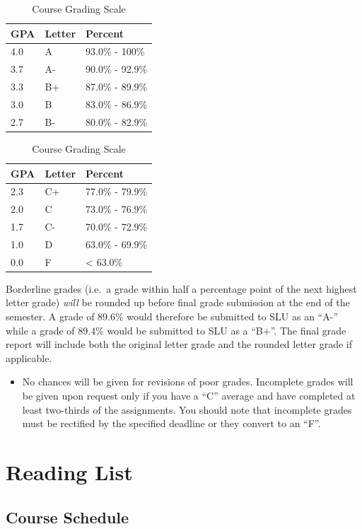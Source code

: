 \documentclass[]{book}
\newenvironment{rmdblock}[1]
  {\begin{shaded*}
  \begin{itemize}
  \renewcommand{\labelitemi}{
    \raisebox{-.7\height}[0pt][0pt]{
      {\setkeys{Gin}{width=3em,keepaspectratio}\texttt{[image: images/\#1]}}
    }
  }
  \item
  }
  {
  \end{itemize}
  \end{shaded*}
  }
\newenvironment{rmdwarning}
  {\begin{rmdblock}{warning}}
  {\end{rmdblock}}
\begin{document}
\begin{table}
\caption{\label{tab:unnamed-chunk-8}Course Grading Scale}

\centering
\begin{tabular}[t]{lll}
\toprule
GPA & Letter & Percent\\
\midrule
4.0 & A & 93.0\% - 100\%\\
3.7 & A- & 90.0\% - 92.9\%\\
3.3 & B+ & 87.0\% - 89.9\%\\
3.0 & B & 83.0\% - 86.9\%\\
2.7 & B- & 80.0\% - 82.9\%\\
\bottomrule
\end{tabular}
\centering
\begin{tabular}[t]{lll}
\toprule
GPA & Letter & Percent\\
\midrule
2.3 & C+ & 77.0\% - 79.9\%\\
2.0 & C & 73.0\% - 76.9\%\\
1.7 & C- & 70.0\% - 72.9\%\\
1.0 & D & 63.0\% - 69.9\%\\
0.0 & F & < 63.0\%\\
\bottomrule
\end{tabular}
\end{table}

Borderline grades (i.e.~a grade within half a percentage point of the next highest letter grade) \emph{will} be rounded up before final grade submission at the end of the semester. A grade of 89.6\% would therefore be submitted to SLU as an ``A-'' while a grade of 89.4\% would be submitted to SLU as a ``B+''. The final grade report will include both the original letter grade and the rounded letter grade if applicable.

\begin{rmdwarning}
No chances will be given for revisions of poor grades. Incomplete grades
will be given upon request only if you have a ``C'' average and have
completed at least two-thirds of the assignments. You should note that
incomplete grades must be rectified by the specified deadline or they
convert to an ``F''.
\end{rmdwarning}

\hypertarget{part-reading-list}{%
\part{Reading List}\label{part-reading-list}}

\hypertarget{course-schedule}{%
\chapter{Course Schedule}\label{course-schedule}}
\end{document}
